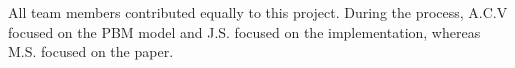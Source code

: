 All team members contributed equally to this project. During the process, A.C.V focused on the PBM model and J.S. focused on the implementation, whereas M.S. focused on the paper.